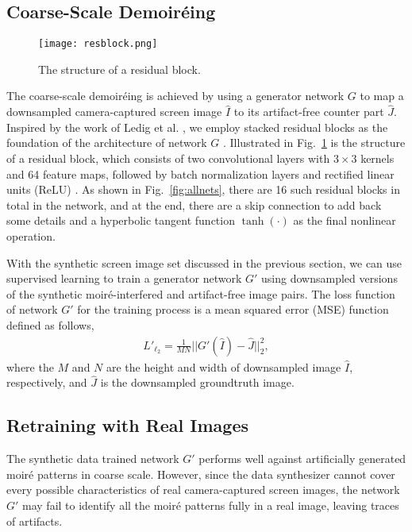 \documentclass[10pt,twocolumn,letterpaper]{article}
\begin{document}
\subsection{Coarse-Scale Demoir\'eing}

\begin{figure}
  \centering
  \texttt{[image: resblock.png]}
  \caption{The structure of a residual block.}
  \label{fig:resblock}
\end{figure}

The coarse-scale demoir\'eing is achieved by using a generator network
$G$ to map a downsampled camera-captured screen image $\hat{I}$ to its
artifact-free counter part $\hat{J}$.  Inspired by the work of Ledig
et al. \cite{ledig2016photo}, we employ stacked residual blocks as the
foundation of the architecture of network $G$
\cite{gross2016training}.  Illustrated in Fig.~\ref{fig:resblock} is
the structure of a residual block, which consists of two convolutional
layers with $3 \times 3$ kernels and 64 feature maps, followed by
batch normalization layers \cite{ioffe2015batch} and rectified linear
units (ReLU) \cite{nair2010rectified}.  As shown in
Fig.~\ref{fig:allnets}, there are 16 such residual blocks in total in
the network, and at the end, there are a skip connection to add back
some details and a hyperbolic tangent function $\tanh(\cdot)$ as the
final nonlinear operation.

With the synthetic screen image set discussed in the previous section,
we can use supervised learning to train a generator network $G'$ using
downsampled versions of the synthetic moir\'e-interfered and
artifact-free image pairs.  The loss function of network $G'$ for the
training process is a mean squared error (MSE) function defined as
follows,
\begin{align}
  L'_{\ell_2} = \frac{1}{MN}||G'(\hat{I}) - \hat{J}||_2^2,
\end{align}
where the $M$ and $N$ are the height and width of downsampled image
$\hat{I}$, respectively, and $\hat{J}$ is the downsampled groundtruth
image.

\subsection{Retraining with Real Images}

The synthetic data trained network $G'$ performs well against
artificially generated moir\'e patterns in coarse scale.  However,
since the data synthesizer cannot cover every possible characteristics
of real camera-captured screen images, the network $G'$ may fail to
identify all the moir\'e patterns fully in a real image, leaving
traces of artifacts.
\end{document}
